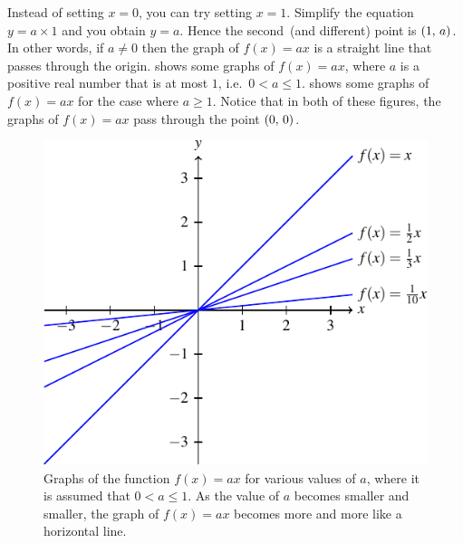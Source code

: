 \documentclass[a4paper,oneside,12pt]{article}
\begin{document}
Instead of setting $x = 0$, you can try setting $x = 1$.  Simplify the
equation $y = a \times 1$ and you obtain $y = a$.  Hence the
second~(and different) point is $\left\lparen{1},\, {a}\right\rparen$.  In other words, if
$a \neq 0$ then the graph of $f(x) = ax$ is a straight line that
passes through the origin.  
shows some graphs of $f(x) = ax$, where $a$ is a positive real number
that is at most $1$, i.e.~$0 < a \leq 1$.
 shows some graphs of
$f(x) = ax$ for the case where $a \geq 1$.  Notice that in both of
these figures, the graphs of $f(x) = ax$ pass through the point
$\left\lparen{0},\, {0}\right\rparen$.

\begin{figure}[!htbp]
\centering
\includegraphics[scale=1]{image/06/ax-small.pdf}
\caption{%
  Graphs of the function $f(x) = ax$ for various values of $a$, where
  it is assumed that $0 < a \leq 1$.  As the value of $a$ becomes
  smaller and smaller, the graph of $f(x) = ax$ becomes more and more
  like a horizontal line.
}
\label{fig:function_ax_positive_rational}
\end{figure}
\end{document}
